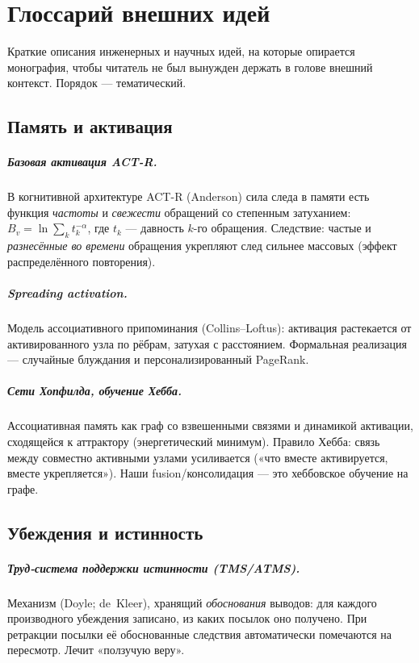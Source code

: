 \chapter{Глоссарий внешних идей}
\label{ch:glossary}

Краткие описания инженерных и научных идей, на которые опирается монография, чтобы
читатель не был вынужден держать в голове внешний контекст. Порядок — тематический.

\section*{Память и активация}

\paragraph{Базовая активация ACT-R.} В когнитивной архитектуре ACT-R (Anderson)
сила следа в памяти есть функция \emph{частоты} и \emph{свежести} обращений со
степенным затуханием: $B_v=\ln\sum_k t_k^{-\alpha}$, где $t_k$ — давность $k$-го
обращения. Следствие: частые и \emph{разнесённые во времени} обращения укрепляют
след сильнее массовых (эффект распределённого повторения).

\paragraph{Spreading activation.} Модель ассоциативного припоминания
(Collins–Loftus): активация растекается от активированного узла по рёбрам, затухая
с расстоянием. Формальная реализация — случайные блуждания и персонализированный
PageRank.

\paragraph{Сети Хопфилда, обучение Хебба.} Ассоциативная память как граф со
взвешенными связями и динамикой активации, сходящейся к аттрактору (энергетический
минимум). Правило Хебба: связь между совместно активными узлами усиливается («что
вместе активируется, вместе укрепляется»). Наши fusion/консолидация — это
хеббовское обучение на графе.

\section*{Убеждения и истинность}

\paragraph{Труд-система поддержки истинности (TMS/ATMS).} Механизм (Doyle;
de~Kleer), хранящий \emph{обоснования} выводов: для каждого производного убеждения
записано, из каких посылок оно получено. При ретракции посылки её обоснованные
следствия автоматически помечаются на пересмотр. Лечит «ползучую веру».

